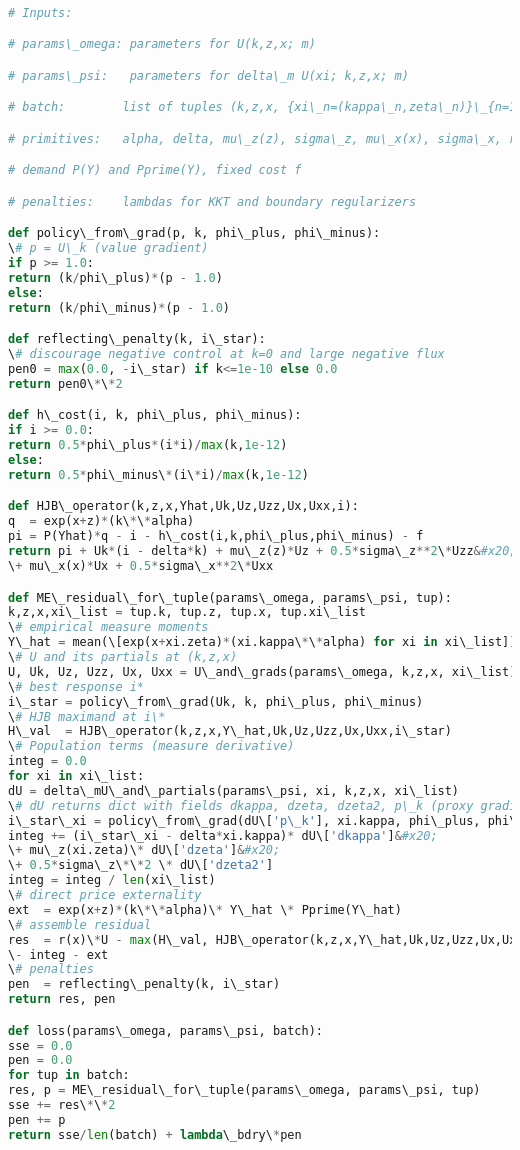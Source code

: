 \documentclass[11pt,letterpaper,oneside]{article}
\numberwithin{equation}{section}
\newcommand{\1}{\mathbf{1}}
\begin{document}
\begin{lstlisting}[language=Python,caption={Pseudo-JAX for (ME) residual with empirical measure}]

# Inputs:

# params\_omega: parameters for U(k,z,x; m)

# params\_psi:   parameters for delta\_m U(xi; k,z,x; m)

# batch:        list of tuples (k,z,x, {xi\_n=(kappa\_n,zeta\_n)}\_{n=1}^N )

# primitives:   alpha, delta, mu\_z(z), sigma\_z, mu\_x(x), sigma\_x, r(x),

# demand P(Y) and Pprime(Y), fixed cost f

# penalties:    lambdas for KKT and boundary regularizers

def policy\_from\_grad(p, k, phi\_plus, phi\_minus):
\# p = U\_k (value gradient)
if p >= 1.0:
return (k/phi\_plus)*(p - 1.0)
else:
return (k/phi\_minus)*(p - 1.0)

def reflecting\_penalty(k, i\_star):
\# discourage negative control at k=0 and large negative flux
pen0 = max(0.0, -i\_star) if k<=1e-10 else 0.0
return pen0\*\*2

def h\_cost(i, k, phi\_plus, phi\_minus):
if i >= 0.0:
return 0.5*phi\_plus*(i*i)/max(k,1e-12)
else:
return 0.5*phi\_minus\*(i\*i)/max(k,1e-12)

def HJB\_operator(k,z,x,Yhat,Uk,Uz,Uzz,Ux,Uxx,i):
q  = exp(x+z)*(k\*\*alpha)
pi = P(Yhat)*q - i - h\_cost(i,k,phi\_plus,phi\_minus) - f
return pi + Uk*(i - delta*k) + mu\_z(z)*Uz + 0.5*sigma\_z**2\*Uzz&#x20;
\+ mu\_x(x)*Ux + 0.5*sigma\_x**2\*Uxx

def ME\_residual\_for\_tuple(params\_omega, params\_psi, tup):
k,z,x,xi\_list = tup.k, tup.z, tup.x, tup.xi\_list
\# empirical measure moments
Y\_hat = mean(\[exp(x+xi.zeta)*(xi.kappa\*\*alpha) for xi in xi\_list])
\# U and its partials at (k,z,x)
U, Uk, Uz, Uzz, Ux, Uxx = U\_and\_grads(params\_omega, k,z,x, xi\_list)
\# best response i*
i\_star = policy\_from\_grad(Uk, k, phi\_plus, phi\_minus)
\# HJB maximand at i\*
H\_val  = HJB\_operator(k,z,x,Y\_hat,Uk,Uz,Uzz,Ux,Uxx,i\_star)
\# Population terms (measure derivative)
integ = 0.0
for xi in xi\_list:
dU = delta\_mU\_and\_partials(params\_psi, xi, k,z,x, xi\_list)
\# dU returns dict with fields dkappa, dzeta, dzeta2, p\_k (proxy gradient)
i\_star\_xi = policy\_from\_grad(dU\['p\_k'], xi.kappa, phi\_plus, phi\_minus)
integ += (i\_star\_xi - delta*xi.kappa)* dU\['dkappa']&#x20;
\+ mu\_z(xi.zeta)\* dU\['dzeta']&#x20;
\+ 0.5*sigma\_z\*\*2 \* dU\['dzeta2']
integ = integ / len(xi\_list)
\# direct price externality
ext  = exp(x+z)*(k\*\*alpha)\* Y\_hat \* Pprime(Y\_hat)
\# assemble residual
res  = r(x)\*U - max(H\_val, HJB\_operator(k,z,x,Y\_hat,Uk,Uz,Uzz,Ux,Uxx,0.0))&#x20;
\- integ - ext
\# penalties
pen  = reflecting\_penalty(k, i\_star)
return res, pen

def loss(params\_omega, params\_psi, batch):
sse = 0.0
pen = 0.0
for tup in batch:
res, p = ME\_residual\_for\_tuple(params\_omega, params\_psi, tup)
sse += res\*\*2
pen += p
return sse/len(batch) + lambda\_bdry\*pen
\end{lstlisting}
\end{document}
